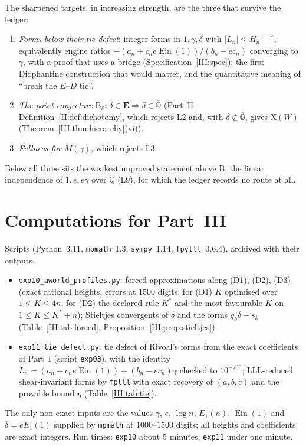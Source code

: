 \documentclass[11pt,a4paper]{article}
\newcommand{\Qbar}{\overline{\mathbb Q}}
\newcommand{\Ein}{\operatorname{Ein}}
\newcommand{\EE}{\mathbf E}
\theoremstyle{definition}
\theoremstyle{remark}
\numberwithin{equation}{section}
\begin{document}
The sharpened targets, in increasing strength, are the three that survive the ledger:
\begin{enumerate}[label=(T\arabic*)]
\item \emph{Forms below their tie defect}: integer forms in $1,\gamma,\delta$ with
$|L_n|\le H_n^{-1-\varepsilon}$, equivalently engine ratios
$-(a_n+c_ne\Ein(1))/(b_n-ec_n)$ converging to $\gamma$, with a proof that uses a bridge
(Specification~\ref{III:spec}); the first Diophantine construction that would matter, and
the quantitative meaning of ``break the $E$--$D$ tie''.
\item \emph{The point conjecture} $\mathrm B_\delta$: $\delta\in\EE\Rightarrow\delta\in\Qbar$
(Part~II, Definition~\ref{II:def:dichotomy}, which rejects L2 and, with $\delta\notin\Qbar$, gives
$\mathrm X(W)$ (Theorem~\ref{III:thm:hierarchy}(vi)).
\item \emph{Fullness for $M(\gamma)$}, which rejects L3.
\end{enumerate}
Below all three sits the weakest unproved statement above $\mathrm B$, the linear
independence of $1,e,e\gamma$ over $\Qbar$ (L9), for which the ledger records no
route at all.

\section{Computations for Part~III}\label{III:sec:computations}

Scripts (Python~3.11, \texttt{mpmath}~1.3, \texttt{sympy}~1.14, \texttt{fpylll}~0.6.4),
archived with their outputs.
\begin{itemize}[leftmargin=*]
\item \texttt{exp10\_aworld\_profiles.py}: forced approximations along (D1), (D2), (D3)
(exact rational heights, errors at $1500$ digits; for (D1) $K$ optimised over
$1\le K\le4n$, for (D2) the declared rule $K^*$ and the most favourable $K$ on
$1\le K\le K^*+n$); Stieltjes convergents of $\delta$ and the forms $q_k\delta-s_k$
(Table~\ref{III:tab:forced}, Proposition~\ref{III:prop:stieltjes}).
\item \texttt{exp11\_tie\_defect.py}: tie defect of Rivoal's forms from the exact
coefficients of Part~I (script \texttt{exp03}), with the identity
$L_n=(a_n+c_ne\Ein(1))+(b_n-ec_n)\gamma$ checked to $10^{-700}$; LLL-reduced
shear-invariant forms by \texttt{fplll} with exact recovery of $(a,b,c)$ and the provable
bound $\eta$ (Table~\ref{III:tab:tie}).
\end{itemize}
The only non-exact inputs are the values $\gamma$, $e$, $\log n$, $E_1(n)$, $\Ein(1)$ and
$\delta=eE_1(1)$ supplied by \texttt{mpmath} at $1000$--$1500$ digits; all heights and
coefficients are exact integers. Run times: \texttt{exp10} about $5$ minutes,
\texttt{exp11} under one minute.
\end{document}
